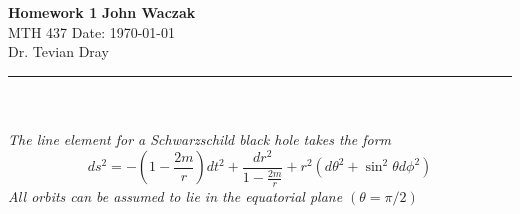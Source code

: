 \documentclass[a4paper, 11pt]{article}
\begin{document}
\noindent
\large\textbf{Homework 1} \hfill \textbf{John Waczak} \\
\normalsize MTH 437 \hfill  Date: \today \\
Dr. Tevian Dray %
\par\noindent\rule{\textwidth}{0.4pt} \\\\


\noindent\textit{The line element for a Schwarzschild black hole takes the form}
\begin{equation}
  ds^2 = -\left( 1-\frac{2m}{r} \right)dt^2+\frac{dr^2}{1-\frac{2m}{r}}+ r^2(d\theta^2+\sin^2\theta d\phi^2)
\end{equation}
\textit{All orbits can be assumed to lie in the equatorial plane $(\theta = \pi/2)$}
\end{document}

